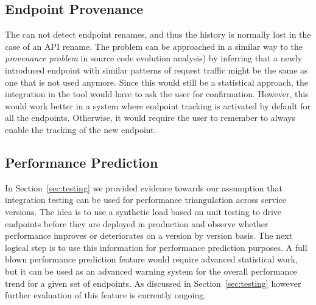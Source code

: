   \subsection*{Endpoint Provenance }

    The \tool can not detect endpoint renames, and thus the history is normally lost in the case of an API rename. The problem can be approached in a similar way to the {\em provenance problem} in source code evolution analysis)\cite{Davi11a} by inferring that a newly introduced endpoint with similar patterns of request traffic might be the same as one that is not used anymore. Since this would still be a statistical approach, the integration in the tool would have to ask the user for confirmation. 
    However, this would work better in a system where endpoint tracking is activated by default for all the endpoints. Otherwise, it would require the user to remember to always enable the tracking of the new endpoint. 






  \subsection*{Performance Prediction}

	In Section~\ref{sec:testing} we provided evidence towards our assumption that integration testing can be used for performance triangulation across service versions. The idea is to use a synthetic load based on unit testing to drive endpoints before they are deployed in production and observe whether performance improves or deteriorates on a version by version basis. The next logical step is to use this information for performance prediction purposes. A full blown performance prediction feature would require advanced statistical work, but it can be used as an advanced warning system for the overall performance trend for a given set of endpoints. As discussed in Section~\ref{sec:testing} however further evaluation of this feature is currently ongoing.

